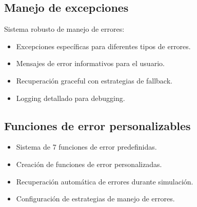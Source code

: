 \subsection{Manejo de excepciones}

Sistema robusto de manejo de errores:

\begin{itemize}
    \item Excepciones específicas para diferentes tipos de errores.
    \item Mensajes de error informativos para el usuario.
    \item Recuperación graceful con estrategias de fallback.
    \item Logging detallado para debugging.
\end{itemize}

\subsection{Funciones de error personalizables}

\begin{itemize}
    \item Sistema de 7 funciones de error predefinidas.
    \item Creación de funciones de error personalizadas.    
    \item Recuperación automática de errores durante simulación.
    \item Configuración de estrategias de manejo de errores.
\end{itemize}

